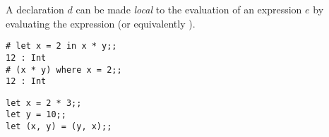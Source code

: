 \documentclass[11pt]{article}
\begin{document}

A declaration $d$ can be made {\em local\/} to the evaluation of an expression $e$ by
evaluating the expression  (or equivalently
).

\begin{session}
\emlsession
\begin{verbatim}
# let x = 2 in x * y;;
12 : Int
# (x * y) where x = 2;;
12 : Int
\end{verbatim}
%
\emlfile
\begin{verbatim}
let x = 2 * 3;;
let y = 10;;
let (x, y) = (y, x);;
\end{verbatim}
\emlend
\end{session}






\end{document}

